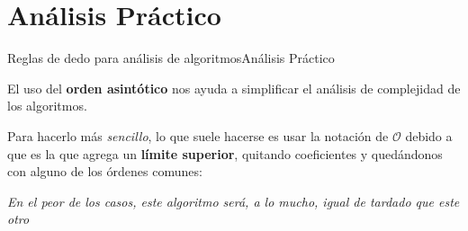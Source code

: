 \documentclass[spanish, c]{beamer}
\newcommand{\bigO}{\mathcal{O}}
\begin{document}
\section{Análisis Práctico}

\begin{frame}{Reglas de dedo para análisis de algoritmos}{Análisis Práctico}

    El uso del \textbf{orden asintótico} nos ayuda a simplificar el análisis de complejidad de los algoritmos. \pause

    \bigskip

    Para hacerlo más \textit{sencillo}, lo que suele hacerse es usar la notación de $\bigO$ debido a que es la que agrega un \textbf{límite superior}, quitando coeficientes y quedándonos con alguno de los órdenes comunes: \pause

    \bigskip

    \begin{center}
        \huge
        \textit{En el peor de los casos, este algoritmo será, a lo mucho, igual de tardado que este otro}
    \end{center}
\end{frame}
\end{document}
